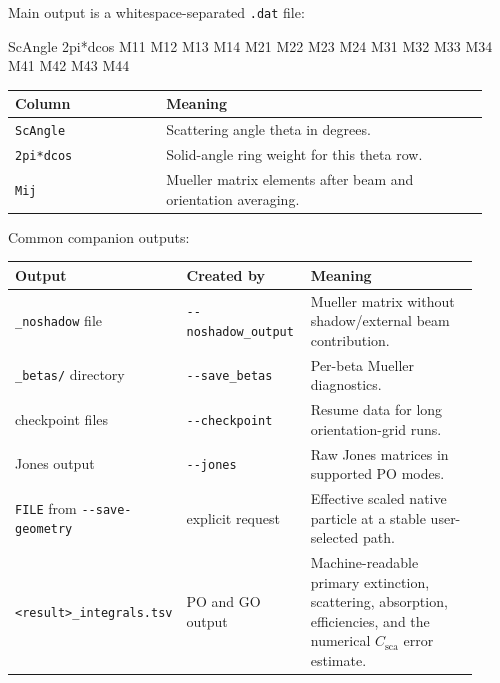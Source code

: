 \documentclass[
  10pt,
  a4paper,
]{article}
\newenvironment{Shaded}{}{}
\newcommand{\NormalTok}[1]{#1}
\begin{document}
Main output is a whitespace-separated \texttt{.dat} file:

\begin{Shaded}
\begin{Highlighting}[]
\NormalTok{ScAngle 2pi*dcos M11 M12 M13 M14 M21 M22 M23 M24 M31 M32 M33 M34 M41 M42 M43 M44}
\end{Highlighting}
\end{Shaded}

\begin{longtable}[]{@{}L{0.30\linewidth}L{0.64\linewidth}@{}}
\toprule\noalign{}
Column & Meaning \\
\midrule\noalign{}
\endhead
\bottomrule\noalign{}
\endlastfoot
\texttt{ScAngle} & Scattering angle theta in degrees. \\
\texttt{2pi*dcos} & Solid-angle ring weight for this theta row. \\
\texttt{Mij} & Mueller matrix elements after beam and orientation
averaging. \\
\end{longtable}

Common companion outputs:

\begin{longtable}[]{@{}L{0.25\linewidth}L{0.27\linewidth}L{0.40\linewidth}@{}}
\toprule\noalign{}
Output & Created by & Meaning \\
\midrule\noalign{}
\endhead
\bottomrule\noalign{}
\endlastfoot
\texttt{\_noshadow} file & \texttt{-\/-noshadow\_output} & Mueller
matrix without shadow/external beam contribution. \\
\texttt{\_betas/} directory & \texttt{-\/-save\_betas} & Per-beta
Mueller diagnostics. \\
checkpoint files & \texttt{-\/-checkpoint} & Resume data for long
orientation-grid runs. \\
Jones output & \texttt{-\/-jones} & Raw Jones matrices in supported PO
modes. \\
\texttt{FILE} from \texttt{-\/-save-geometry} & explicit request & Effective
scaled native particle at a stable user-selected path. \\
\texttt{<result>\_integrals.tsv} & PO and GO output & Machine-readable primary
extinction, scattering, absorption, efficiencies, and the numerical
$C_{\mathrm{sca}}$ error estimate. \\
\end{longtable}
\end{document}
